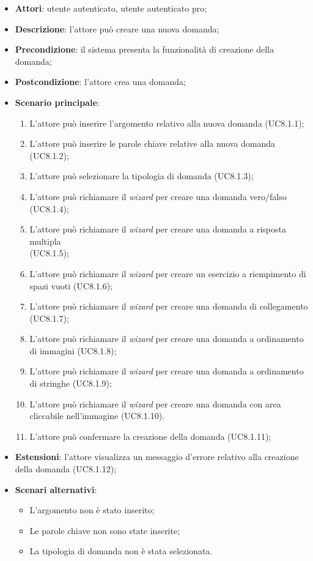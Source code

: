 	\begin{itemize}
		\item
			\textbf{Attori}: utente autenticato, utente autenticato pro;
		\item		
			\textbf{Descrizione}: l'attore può creare una nuova domanda;
		\item
			\textbf{Precondizione}: il sistema presenta la funzionalità di creazione della domanda;
		\item
			\textbf{Postcondizione}: l'attore crea una domanda;		
		\item
			\textbf{Scenario principale}:
	       		\begin{enumerate}
					\item
					L'attore può inserire l'argomento relativo alla nuova domanda (UC8.1.1);
					\item
					L'attore può inserire le parole chiave relative alla nuova domanda (UC8.1.2);
					\item
					L'attore può selezionare la tipologia di domanda (UC8.1.3);
					
					\item
					L'attore può richiamare il \textit{wizard} per creare una domanda vero/falso (UC8.1.4);
					\item
					L'attore può richiamare il \textit{wizard} per creare una domanda a risposta multipla \\(UC8.1.5);
					\item
					L'attore può richiamare il \textit{wizard} per creare un esercizio a riempimento di spazi vuoti (UC8.1.6);
					\item
					L'attore può richiamare il \textit{wizard} per creare una domanda di collegamento (UC8.1.7);
					\item
					L'attore può richiamare il \textit{wizard} per creare una domanda a ordinamento di immagini (UC8.1.8);
					\item
					L'attore può richiamare il \textit{wizard} per creare una domanda a ordinamento di stringhe (UC8.1.9);
					\item
					L'attore può richiamare il \textit{wizard} per creare una domanda con area cliccabile nell'immagine (UC8.1.10).
					\item
					L'attore può confermare la creazione della domanda (UC8.1.11);
	 			\end{enumerate}
	 	\item
			\textbf{Estensioni}: l'attore visualizza un messaggio d'errore relativo alla creazione della domanda (UC8.1.12);
	 	\item
	 		\textbf{Scenari alternativi}:
				\begin{itemize}
					\item 	
						L'argomento non è stato inserito;
					\item
						Le parole chiave non sono state inserite;
					\item
						La tipologia di domanda non è stata selezionata.	
				\end{itemize}
	\end{itemize}
